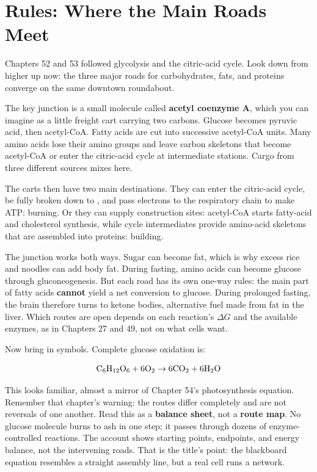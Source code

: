 \section{Rules: Where the Main Roads Meet}

Chapters 52 and 53 followed glycolysis and the citric-acid cycle. Look down from higher up now: the three major roads for carbohydrates, fats, and proteins converge on the same downtown roundabout.

The key junction is a small molecule called \textbf{acetyl coenzyme A}, which you can imagine as a little freight cart carrying two carbons. Glucose becomes pyruvic acid, then acetyl-CoA. Fatty acids are cut into successive acetyl-CoA units. Many amino acids lose their amino groups and leave carbon skeletons that become acetyl-CoA or enter the citric-acid cycle at intermediate stations. Cargo from three different sources mixes here.

The carts then have two main destinations. They can enter the citric-acid cycle, be fully broken down to , and pass electrons to the respiratory chain to make ATP: burning. Or they can supply construction sites: acetyl-CoA starts fatty-acid and cholesterol synthesis, while cycle intermediates provide amino-acid skeletons that are assembled into proteins: building.

The junction works both ways. Sugar can become fat, which is why excess rice and noodles can add body fat. During fasting, amino acids can become glucose through gluconeogenesis. But each road has its own one-way rules: the main part of fatty acids \textbf{cannot} yield a net conversion to glucose. During prolonged fasting, the brain therefore turns to ketone bodies, alternative fuel made from fat in the liver. Which routes are open depends on each reaction's $\Delta G$ and the available enzymes, as in Chapters 27 and 49, not on what cells want.

Now bring in symbols. Complete glucose oxidation is:

\[\mathrm{C_6H_{12}O_6} + \mathrm{6O_2} \rightarrow \mathrm{6CO_2} + \mathrm{6H_2O}\]

This looks familiar, almost a mirror of Chapter 54's photosynthesis equation. Remember that chapter's warning: the routes differ completely and are not reversals of one another. Read this as a \textbf{balance sheet}, not a \textbf{route map}. No glucose molecule burns to ash in one step; it passes through dozens of enzyme-controlled reactions. The account shows starting points, endpoints, and energy balance, not the intervening roads. That is the title's point: the blackboard equation resembles a straight assembly line, but a real cell runs a network.

